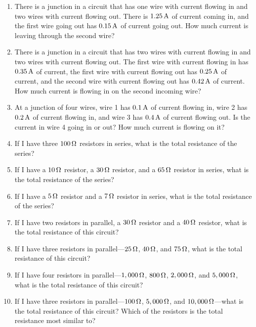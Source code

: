\applysection

\begin{enumerate}
\item There is a junction in a circuit that has one wire with current flowing in and two wires with current flowing out.  There is $1.25\,\si{\ampere}$ of current coming in, and the first wire going out has $0.15\,\si{\ampere}$ of current going out.  How much current is leaving through the second wire?
\item There is a junction in a circuit that has two wires with current flowing in and two wires with current flowing out.  The first wire with current flowing in has $0.35\,\si{\ampere}$ of current, the first wire with current flowing out has $0.25\,\si{\ampere}$ of current, and the second wire with current flowing out has $0.42\,\si{\ampere}$ of current.  How much current is flowing in on the second incoming wire?
\item At a junction of four wires, wire 1 has $0.1\,\si{\ampere}$ of current flowing in, wire 2 has $0.2\,\si{\ampere}$ of current flowing in, and wire 3 has $0.4\,\si{\ampere}$ of current flowing out.  Is the current in wire 4 going in or out?  How much current is flowing on it?
\item If I have three $100\,\si{\ohm}$ resistors in series, what is the total resistance of the series?
\item If I have a $10\,\si{\ohm}$ resistor, a $30\,\si{\ohm}$ resistor, and a $65\,\si{\ohm}$ resistor in series, what is the total resistance of the series?
\item If I have a $5\,\si{\ohm}$ resistor and a $7\,\si{\ohm}$ resistor in series, what is the total resistance of the series?
\item If I have two resistors in parallel, a $30\,\si{\ohm}$ resistor and a $40\,\si{\ohm}$ resistor, what is the total resistance of this circuit?
\item If I have three resistors in parallel---$25\,\si{\ohm}$, $40\,\si{\ohm}$, and $75\,\si{\ohm}$, what is the total resistance of this circuit?
\item If I have four resistors in parallel---$1,000\,\si{\ohm}$, $800\,\si{\ohm}$, $2,000\,\si{\ohm}$, and $5,000\,\si{\ohm}$, what is the total resistance of this circuit?
\item If I have three resistors in parallel---$100\,\si{\ohm}$, $5,000\,\si{\ohm}$, and $10,000\,\si{\ohm}$---what is the total resistance of this circuit?  Which of the resistors is the total resistance most similar to?

\end{enumerate}
